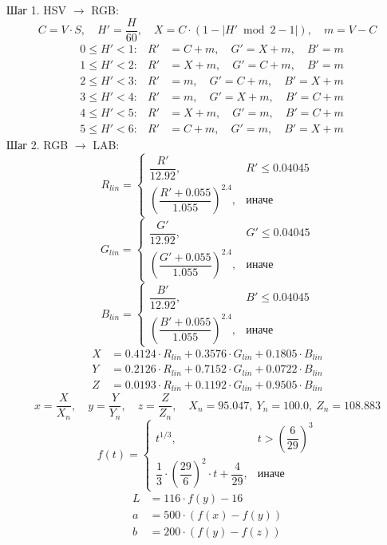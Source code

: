\documentclass[12pt,a4paper]{article}
\begin{document}
Шаг 1. HSV \(\to\) RGB:
\[
C = V \cdot S,\quad H' = \frac{H}{60},\quad X = C \cdot (1 - |H' \bmod 2 - 1|),\quad m = V - C
\]
\begin{align*}
&0 \le H' < 1: & R' &= C + m,\quad G' = X + m,\quad B' = m \\
&1 \le H' < 2: & R' &= X + m,\quad G' = C + m,\quad B' = m \\
&2 \le H' < 3: & R' &= m,\quad G' = C + m,\quad B' = X + m \\
&3 \le H' < 4: & R' &= m,\quad G' = X + m,\quad B' = C + m \\
&4 \le H' < 5: & R' &= X + m,\quad G' = m,\quad B' = C + m \\
&5 \le H' < 6: & R' &= C + m,\quad G' = m,\quad B' = X + m
\end{align*}
Шаг 2. RGB \(\to\) LAB:
\[
R_{lin} = \begin{cases} \dfrac{R'}{12.92}, & R' \le 0.04045 \\[8pt] \left( \dfrac{R' + 0.055}{1.055} \right)^{2.4}, & \text{иначе} \end{cases}
\]
\[
G_{lin} = \begin{cases} \dfrac{G'}{12.92}, & G' \le 0.04045 \\[8pt] \left( \dfrac{G' + 0.055}{1.055} \right)^{2.4}, & \text{иначе} \end{cases}
\]
\[
B_{lin} = \begin{cases} \dfrac{B'}{12.92}, & B' \le 0.04045 \\[8pt] \left( \dfrac{B' + 0.055}{1.055} \right)^{2.4}, & \text{иначе} \end{cases}
\]
\begin{align*}
X &= 0.4124 \cdot R_{lin} + 0.3576 \cdot G_{lin} + 0.1805 \cdot B_{lin} \\
Y &= 0.2126 \cdot R_{lin} + 0.7152 \cdot G_{lin} + 0.0722 \cdot B_{lin} \\
Z &= 0.0193 \cdot R_{lin} + 0.1192 \cdot G_{lin} + 0.9505 \cdot B_{lin}
\end{align*}
\[
x = \frac{X}{X_n},\quad y = \frac{Y}{Y_n},\quad z = \frac{Z}{Z_n},\quad X_n = 95.047,\ Y_n = 100.0,\ Z_n = 108.883
\]
\[
f(t) = \begin{cases} t^{1/3}, & t > \left(\dfrac{6}{29}\right)^3 \\[8pt] \dfrac{1}{3} \cdot \left(\dfrac{29}{6}\right)^2 \cdot t + \dfrac{4}{29}, & \text{иначе} \end{cases}
\]
\begin{align*}
L &= 116 \cdot f(y) - 16 \\
a &= 500 \cdot (f(x) - f(y)) \\
b &= 200 \cdot (f(y) - f(z))
\end{align*}
\end{document}
